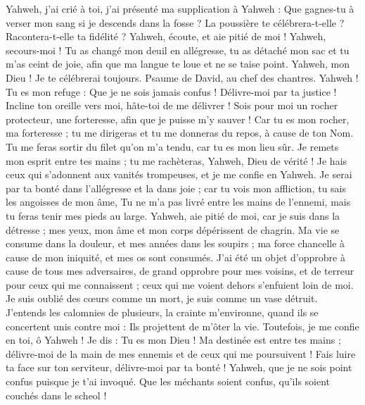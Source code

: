 \begin{multicols}{2}
Yahweh, j'ai crié à toi, j'ai présenté ma supplication à Yahweh :
Que gagnes-tu à verser mon sang si je descends dans la fosse ? La poussière te célébrera-t-elle ? Racontera-t-elle ta fidélité ?
Yahweh, écoute, et aie pitié de moi ! Yahweh, secours-moi !
Tu as changé mon deuil en allégresse, tu as détaché mon sac et tu m'as ceint de joie,
afin que ma langue te loue et ne se taise point. Yahweh, mon Dieu ! Je te célébrerai toujours.
\VerseOne{}Psaume de David, au chef des chantres.
Yahweh ! Tu es mon refuge : Que je ne sois jamais confus ! Délivre-moi par ta justice !
Incline ton oreille vers moi, hâte-toi de me délivrer ! Sois pour moi un rocher protecteur, une forteresse, afin que je puisse m’y sauver !
Car tu es mon rocher, ma forteresse ; tu me dirigeras et tu me donneras du repos, à cause de ton Nom.
Tu me feras sortir du filet qu'on m'a tendu, car tu es mon lieu sûr.
Je remets mon esprit entre tes mains ; tu me rachèteras, Yahweh, Dieu de vérité !
Je hais ceux qui s’adonnent aux vanités trompeuses, et je me confie en Yahweh.
Je serai par ta bonté dans l’allégresse et la dans joie ; car tu vois mon affliction, tu sais les angoisses de mon âme,
Tu ne m’a pas livré entre les mains de l'ennemi, mais tu feras tenir mes pieds au large.
Yahweh, aie pitié de moi, car je suis dans la détresse ; mes yeux, mon âme et mon corps dépérissent de chagrin.
Ma vie se consume dans la douleur, et mes années dans les soupirs ; ma force chancelle à cause de mon iniquité, et mes os sont consumés.
J'ai été un objet d’opprobre à cause de tous mes adversaires, de grand opprobre pour mes voisins, et de terreur pour ceux qui me connaissent ; ceux qui me voient dehors s'enfuient loin de moi.
Je suis oublié des cœurs comme un mort, je suis comme un vase détruit.
J’entends les calomnies de plusieurs, la crainte m’environne, quand ils se concertent unis contre moi : Ils projettent de m'ôter la vie.
Toutefois, je me confie en toi, ô Yahweh ! Je dis : Tu es mon Dieu !
Ma destinée est entre tes mains ; délivre-moi de la main de mes ennemis et de ceux qui me poursuivent !
Fais luire ta face sur ton serviteur, délivre-moi par ta bonté !
Yahweh, que je ne sois point confus puisque je t'ai invoqué. Que les méchants soient confus, qu'ils soient couchés dans le scheol !

\end{multicols}
